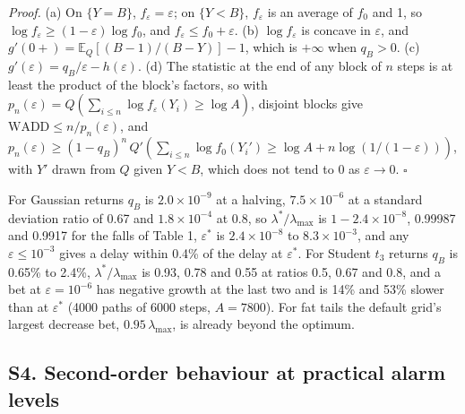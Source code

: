 \documentclass[
]{article}
\begin{document}
\emph{Proof.} (a) On \(\lbrace Y = B\rbrace\),
\(f_\varepsilon = \varepsilon\); on \(\lbrace Y < B\rbrace\),
\(f_\varepsilon\) is an average of \(f_0\) and 1, so
\(\log f_\varepsilon \ge (1 - \varepsilon)\log f_0\), and
\(f_\varepsilon \le f_0 + \varepsilon\). (b) \(\log f_\varepsilon\) is
concave in \(\varepsilon\), and
\(g'(0+) = \mathbb{E}_Q[(B-1)/(B-Y)] - 1\), which is \(+\infty\) when
\(q_B > 0\). (c) \(g'(\varepsilon) = q_B/\varepsilon - h(\varepsilon)\).
(d) The statistic at the end of any block of \(n\) steps is at least the
product of the block's factors, so with
\(p_n(\varepsilon) = Q(\sum_{i \le n}\log f_\varepsilon(Y_i) \ge \log A)\),
disjoint blocks give \(\mathrm{WADD} \le n/p_n(\varepsilon)\), and
\(p_n(\varepsilon) \ge (1 - q_B)^n\,Q'(\sum_{i \le n}\log f_0(Y_i') \ge \log A + n\log(1/(1 - \varepsilon)))\),
with \(Y'\) drawn from \(Q\) given \(Y < B\), which does not tend to 0
as \(\varepsilon \to 0\). \(\square\)

For Gaussian returns \(q_B\) is \(2.0 \times 10^{-9}\) at a halving,
\(7.5 \times 10^{-6}\) at a standard deviation ratio of 0.67 and
\(1.8 \times 10^{-4}\) at 0.8, so \(\lambda^\ast/\lambda_{\max}\) is
\(1 - 2.4\times 10^{-8}\), 0.99987 and 0.9917 for the falls of Table 1,
\(\varepsilon^\ast\) is \(2.4 \times 10^{-8}\) to
\(8.3 \times 10^{-3}\), and any \(\varepsilon \le 10^{-3}\) gives a
delay within 0.4\% of the delay at \(\varepsilon^\ast\). For Student
\(t_3\) returns \(q_B\) is 0.65\% to 2.4\%,
\(\lambda^\ast/\lambda_{\max}\) is 0.93, 0.78 and 0.55 at ratios 0.5,
0.67 and 0.8, and a bet at \(\varepsilon = 10^{-6}\) has negative growth
at the last two and is 14\% and 53\% slower than at \(\varepsilon^\ast\)
(4000 paths of 6000 steps, \(A = 7800\)). For fat tails the default
grid's largest decrease bet, \(0.95\,\lambda_{\max}\), is already beyond
the optimum.

\hypertarget{s4.-second-order-behaviour-at-practical-alarm-levels}{%
\subsection{S4. Second-order behaviour at practical alarm
levels}\label{s4.-second-order-behaviour-at-practical-alarm-levels}}
\end{document}
